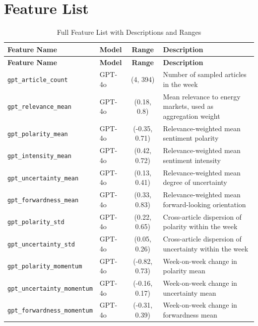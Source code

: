 \documentclass[preprint,12pt,authoryear]{elsarticle}
\begin{document}
\section{Feature List}
\label{app:features}
\setlength{\LTleft}{-2cm}
\begin{longtable}{llcp{5.5cm}}
\caption{Full Feature List with Descriptions and Ranges}
\label{tab:features} \\
\hline
\textbf{Feature Name} & \textbf{Model} & \textbf{Range} & \textbf{Description} \\
\hline
\endfirsthead
\hline
\textbf{Feature Name} & \textbf{Model} & \textbf{Range} & \textbf{Description} \\
\hline
\endhead
\hline
\endfoot


\texttt{gpt\_article\_count}        & GPT-4o  & {(}4, 394{)} & Number of sampled articles in the week \\
\texttt{gpt\_relevance\_mean}       & GPT-4o  & {(}0.18, 0.8{)}     & Mean relevance to energy markets, used as aggregation weight \\
\texttt{gpt\_polarity\_mean}        & GPT-4o  & {(}-0.35, 0.71{)}    & Relevance-weighted mean sentiment polarity \\
\texttt{gpt\_intensity\_mean}       & GPT-4o  & {(}0.42, 0.72{)}     & Relevance-weighted mean sentiment intensity \\
\texttt{gpt\_uncertainty\_mean}     & GPT-4o  & {(}0.13, 0.41{)}     & Relevance-weighted mean degree of uncertainty \\
\texttt{gpt\_forwardness\_mean}     & GPT-4o  & {(}0.33, 0.83{)}     & Relevance-weighted mean forward-looking orientation \\
\texttt{gpt\_polarity\_std}         & GPT-4o  & {(}0.22, 0.65{)}     & Cross-article dispersion of polarity within the week \\
\texttt{gpt\_uncertainty\_std}      & GPT-4o  & {(}0.05, 0.26{)}     & Cross-article dispersion of uncertainty within the week \\
\texttt{gpt\_polarity\_momentum}    & GPT-4o  & {(}-0.82, 0.73{)}    & Week-on-week change in polarity mean \\
\texttt{gpt\_uncertainty\_momentum} & GPT-4o  & {(}-0.16, 0.17{)}    & Week-on-week change in uncertainty mean \\
\texttt{gpt\_forwardness\_momentum} & GPT-4o  & {(}-0.31, 0.39{)}    & Week-on-week change in forwardness mean \\
\hline


\end{longtable}
\end{document}
